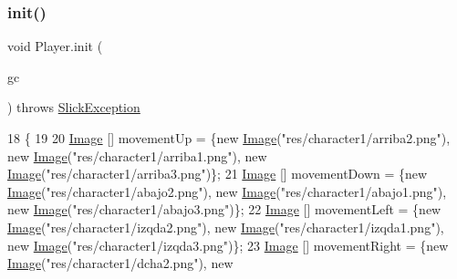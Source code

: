 \subsubsection{\texorpdfstring{init()}{init()}}
{\footnotesize\ttfamily void Player.\+init (\begin{DoxyParamCaption}\item[{\mbox{\hyperlink{classorg_1_1newdawn_1_1slick_1_1_game_container}{Game\+Container}}}]{gc }\end{DoxyParamCaption}) throws \mbox{\hyperlink{classorg_1_1newdawn_1_1slick_1_1_slick_exception}{Slick\+Exception}}\hspace{0.3cm}{\ttfamily [inline]}}


\begin{DoxyCode}
18                                \{
19         
20        \mbox{\hyperlink{classorg_1_1newdawn_1_1slick_1_1_image}{Image}} [] movementUp = \{\textcolor{keyword}{new} \mbox{\hyperlink{classorg_1_1newdawn_1_1slick_1_1_image}{Image}}(\textcolor{stringliteral}{"res/character1/arriba2.png"}), \textcolor{keyword}{new} 
      \mbox{\hyperlink{classorg_1_1newdawn_1_1slick_1_1_image}{Image}}(\textcolor{stringliteral}{"res/character1/arriba1.png"}), \textcolor{keyword}{new} \mbox{\hyperlink{classorg_1_1newdawn_1_1slick_1_1_image}{Image}}(\textcolor{stringliteral}{"res/character1/arriba3.png"})\};
21        \mbox{\hyperlink{classorg_1_1newdawn_1_1slick_1_1_image}{Image}} [] movementDown = \{\textcolor{keyword}{new} \mbox{\hyperlink{classorg_1_1newdawn_1_1slick_1_1_image}{Image}}(\textcolor{stringliteral}{"res/character1/abajo2.png"}), \textcolor{keyword}{new} 
      \mbox{\hyperlink{classorg_1_1newdawn_1_1slick_1_1_image}{Image}}(\textcolor{stringliteral}{"res/character1/abajo1.png"}), \textcolor{keyword}{new} \mbox{\hyperlink{classorg_1_1newdawn_1_1slick_1_1_image}{Image}}(\textcolor{stringliteral}{"res/character1/abajo3.png"})\};
22        \mbox{\hyperlink{classorg_1_1newdawn_1_1slick_1_1_image}{Image}} [] movementLeft = \{\textcolor{keyword}{new} \mbox{\hyperlink{classorg_1_1newdawn_1_1slick_1_1_image}{Image}}(\textcolor{stringliteral}{"res/character1/izqda2.png"}), \textcolor{keyword}{new} 
      \mbox{\hyperlink{classorg_1_1newdawn_1_1slick_1_1_image}{Image}}(\textcolor{stringliteral}{"res/character1/izqda1.png"}), \textcolor{keyword}{new} \mbox{\hyperlink{classorg_1_1newdawn_1_1slick_1_1_image}{Image}}(\textcolor{stringliteral}{"res/character1/izqda3.png"})\};
23        \mbox{\hyperlink{classorg_1_1newdawn_1_1slick_1_1_image}{Image}} [] movementRight = \{\textcolor{keyword}{new} \mbox{\hyperlink{classorg_1_1newdawn_1_1slick_1_1_image}{Image}}(\textcolor{stringliteral}{"res/character1/dcha2.png"}), \textcolor{keyword}{new} 

\end{DoxyCode}
